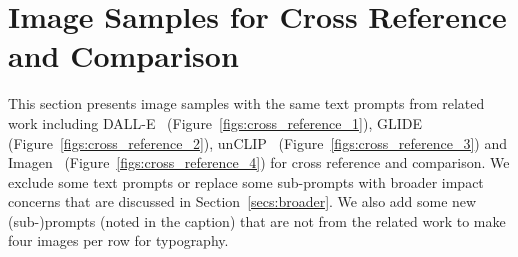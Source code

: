 \section{Image Samples for Cross Reference and Comparison}





This section presents image samples with the same text prompts from related work including DALL-E~\cite{ramesh2021zero} (Figure~\ref{figs:cross_reference_1}), GLIDE~\cite{nichol2021glide} (Figure~\ref{figs:cross_reference_2}), unCLIP~\cite{ramesh2022hierarchical} (Figure~\ref{figs:cross_reference_3}) and Imagen~\cite{imagen} (Figure~\ref{figs:cross_reference_4}) for cross reference and comparison. We exclude some text prompts or replace some sub-prompts with broader impact concerns that are discussed in Section~\ref{secs:broader}. We also add some new (sub-)prompts (noted in the caption) that are not from the related work to make four images per row for typography.

